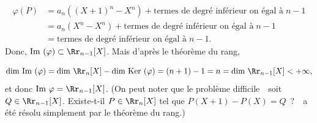 {\begin{enumerate}
{\begin{align*}
\varphi(P)&=a_n((X+1)^n-X^n)+\mbox{termes de degré inférieur on égal à}\;n-1\\
 &=a_n(X^n-X^n)+\mbox{termes de degré
inférieur on égal à}\;n-1\\
 &=\mbox{termes de degré inférieur on égal à}\;n-1.
\end{align*}
Donc, $\mbox{Im }(\varphi)\subset\Rr_{n-1}[X]$. Mais d'après le théorème du rang,

$$\mbox{dim }\mbox{Im }(\varphi)=\mbox{dim }\Rr_n[X]-\mbox{dim }\mbox{Ker }(\varphi)=(n+1)-1=n=\mbox{dim }\Rr_{n-1}[X]
<+\infty,$$
et donc $\mbox{Im }\varphi=\Rr_{n-1}[X]$. (On peut noter que le problème difficile~\og~soit $Q\in\Rr_{n-1}[X]$.
Existe-t-il $P\in\Rr_n[X]$ tel que $P(X+1)-P(X)=Q$~?~\fg~a été résolu simplement par le théorème du rang.)}
\end{enumerate}
}
